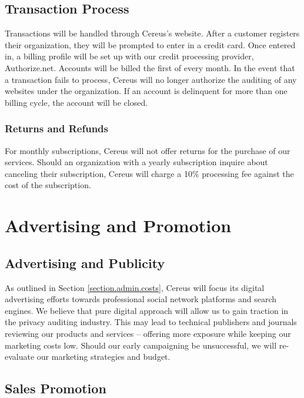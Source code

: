 \subsection{Transaction Process}

Transactions will be handled through Cereus's website. After a customer registers their organization, they will be prompted to enter in a credit card. Once entered in, a billing profile will be set up with our credit processing provider, Authorize.net. Accounts will be billed the first of every month. In the event that a transaction fails to process, Cereus will no longer authorize the auditing of any websites under the organization. If an account is delinquent for more than one billing cycle, the account will be closed.

\subsubsection{Returns and Refunds}

For monthly subscriptions, Cereus will not offer returns for the purchase of our services. Should an organization with a yearly subscription inquire about canceling their subscription, Cereus will charge a 10\% processing fee against the cost of the subscription.



\section{Advertising and Promotion}

\subsection{Advertising and Publicity}

As outlined in Section \ref{section.admin.costs}, Cereus will focus its digital advertising efforts towards professional social network platforms and search engines. We believe that pure digital approach will allow us to gain traction in the privacy auditing industry. This may lead to technical publishers and journals reviewing our products and services -- offering more exposure while keeping our marketing costs low. Should our early campaigning be unsuccessful, we will re-evaluate our marketing strategies and budget.

\subsection{Sales Promotion}

